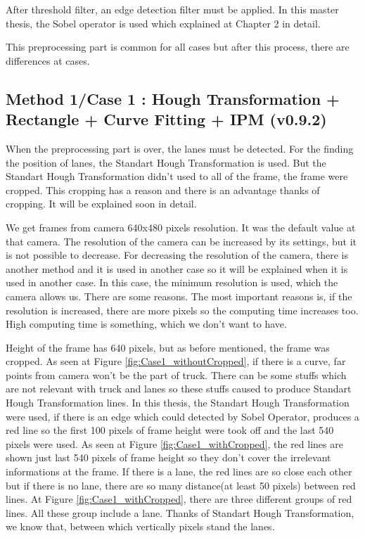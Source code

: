 After threshold filter, an edge detection filter must be applied. In this master thesis, the Sobel operator is used which explained at Chapter 2 in detail.
 
 This preprocessing part is common for all cases but after this process, there are differences at cases.
 
%
\subsection{Method 1/Case 1 : Hough Transformation + Rectangle + Curve Fitting + IPM (v0.9.2)}\label{sec:Case 1}

When the preprocessing part is over, the lanes must be detected. For the finding the position of lanes, the Standart Hough Transformation is used. But the Standart Hough Transformation didn't used to all of the frame, the frame were cropped. This cropping has a reason and there is an advantage thanks of cropping. It will be explained soon in detail.

We get frames from camera 640x480 pixels resolution. It was the default value at that camera. The resolution of the camera can be increased by its settings, but it is not possible to decrease. For decreasing the resolution of the camera, there is another method and it is used in another case so it will be explained when it is used in another case. In this case, the minimum resolution is used, which the camera allows us. There are some reasons. The most important reasons is, if the resolution is increased, there are more pixels so the computing time increases too. High computing time is something, which we don't want to have.
 
Height of the frame has 640 pixels, but as before mentioned, the frame was cropped. As seen at Figure \ref{fig:Case1_withoutCropped}, if there is a curve, far points from camera won't be the part of truck. There can be some stuffs which are not relevant with truck and lanes so these stuffs caused to produce Standart Hough Transformation lines. In this thesis, the Standart Hough Transformation were used, if there is an edge which could detected by Sobel Operator, produces a red line so the first 100 pixels of frame height were took off and the last 540 pixels were used. As seen at Figure \ref{fig:Case1_withCropped}, the red lines are shown just last 540 pixels of frame height so they don't cover the irrelevant informations at the frame. If there is a lane, the red lines are so close each other but if there is no lane, there are so many distance(at least 50 pixels) between red lines. At Figure \ref{fig:Case1_withCropped}, there are three different groups of red lines. All these group include a lane. Thanks of Standart Hough Transformation, we know that, between which vertically pixels stand the lanes. 

